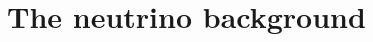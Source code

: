 \documentclass[b5paper, 10pt, twoside]{book}
\renewcommand{\vec}[1]{\symbfit{#1}}
\begin{document}




\chapter{The neutrino background}
\label{chap:background}
\end{document}

